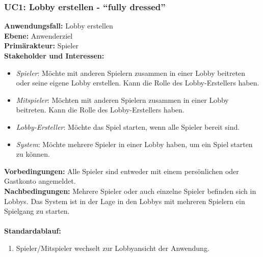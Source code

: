 \documentclass[11pt,ngerman]{article}
\newcommand{\quotes}[1]{``#1''}
\begin{document}
            \subsubsection{UC1: Lobby erstellen - \quotes{fully dressed}}
            \label{ssec:UC1Lobbyerstellen}
                \begin{tcolorbox}[enhanced, breakable, sharp corners, width=\dimexpr\textwidth-15mm\relax ,enlarge left by=10mm ,fontupper=\linespread{1.1}\selectfont, boxrule=1pt, title={UC1: Lobby erstellen}, colback=white, colframe=gray!22, coltitle=black]

                    \textbf{Anwendungsfall:} Lobby erstellen \\
                    \textbf{Ebene:} Anwenderziel \\
                    \textbf{Primärakteur:} Spieler \\
                    \textbf{Stakeholder und Interessen:}
                    \begin{itemize}
                        \item \textit{Spieler}: Möchte mit anderen Spielern zusammen in einer \Gls{Lobby} beitreten oder seine eigene \Gls{Lobby} erstellen. Kann die Rolle des Lobby-Erstellers haben.
                        \item \textit{Mitspieler}: Möchten mit anderen Spielern zusammen in einer \Gls{Lobby} beitreten. Kann die Rolle des Lobby-Erstellers haben.
                        \item \textit{Lobby-Ersteller}:  Möchte das Spiel starten, wenn alle Spieler bereit sind.
                        \item \textit{System}: Möchte mehrere Spieler in einer \Gls{Lobby} haben, um ein Spiel starten zu können.
                    \end{itemize}
                    \textbf{Vorbedingungen:} Alle Spieler sind entweder mit einem persönlichen oder Gastkonto angemeldet.\\
                    \textbf{Nachbedingungen:} Mehrere Spieler oder auch einzelne Spieler befinden sich in \Glspl{Lobby}. Das System ist in der Lage in den \Glspl{Lobby} mit mehreren Spielern ein Spielgang zu starten. \\
                    \\  \textbf{Standardablauf:}
                    \begin{enumerate}
                        \item Spieler/Mitspieler wechselt zur Lobbyansicht der Anwendung.

\end{enumerate}
\end{tcolorbox}
\end{document}
